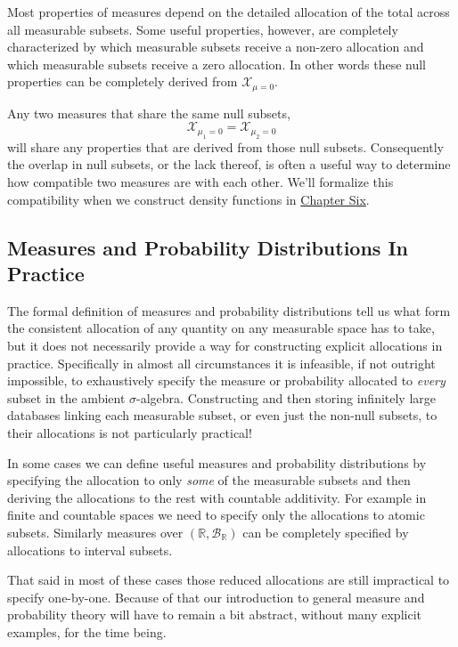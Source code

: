 \documentclass[
  letterpaper,
  DIV=11,
  numbers=noendperiod]{scrartcl}
\begin{document}
Most properties of measures depend on the detailed allocation of the
total across all measurable subsets. Some useful properties, however,
are completely characterized by which measurable subsets receive a
non-zero allocation and which measurable subsets receive a zero
allocation. In other words these null properties can be completely
derived from \(\mathcal{X}_{\mu = 0}\).

Any two measures that share the same null subsets, \[
\mathcal{X}_{\mu_{1} = 0} = \mathcal{X}_{\mu_{2} = 0}
\] will share any properties that are derived from those null subsets.
Consequently the overlap in null subsets, or the lack thereof, is often
a useful way to determine how compatible two measures are with each
other. We'll formalize this compatibility when we construct density
functions in
\href{https://betanalpha.github.io/assets/chapters_html/density_functions.html}{Chapter
Six}.

\hypertarget{measures-and-probability-distributions-in-practice}{%
\subsection{Measures and Probability Distributions In
Practice}\label{measures-and-probability-distributions-in-practice}}

The formal definition of measures and probability distributions tell us
what form the consistent allocation of any quantity on any measurable
space has to take, but it does not necessarily provide a way for
constructing explicit allocations in practice. Specifically in almost
all circumstances it is infeasible, if not outright impossible, to
exhaustively specify the measure or probability allocated to
\emph{every} subset in the ambient \(\sigma\)-algebra. Constructing and
then storing infinitely large databases linking each measurable subset,
or even just the non-null subsets, to their allocations is not
particularly practical!

In some cases we can define useful measures and probability
distributions by specifying the allocation to only \emph{some} of the
measurable subsets and then deriving the allocations to the rest with
countable additivity. For example in finite and countable spaces we need
to specify only the allocations to atomic subsets. Similarly measures
over \((\mathbb{R}, \mathcal{B}_{\mathbb{R}})\) can be completely
specified by allocations to interval subsets.

That said in most of these cases those reduced allocations are still
impractical to specify one-by-one. Because of that our introduction to
general measure and probability theory will have to remain a bit
abstract, without many explicit examples, for the time being.
\end{document}
